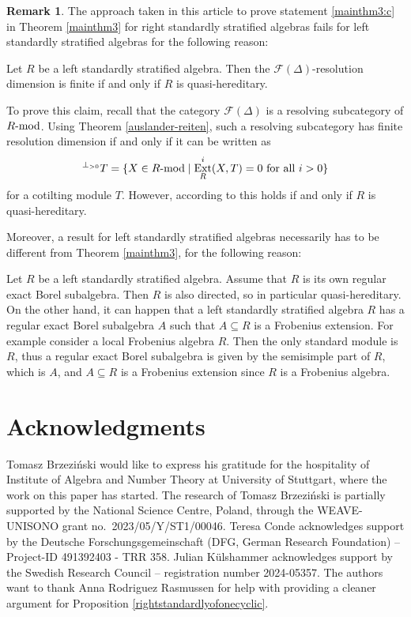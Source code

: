 \documentclass[12pt,a4paper]{amsart}
\theoremstyle{plain}
\theoremstyle{definition}
\newtheorem{rmk}[thm]{Remark}
\numberwithin{equation}{thm}
\DeclareMathOperator{\Ext}{Ext}
\newcommand{\modu}[1]{#1\hbox{-}\mathrm{mod}}
\begin{document}
\begin{rmk}
The approach taken in this article to prove statement \eqref{mainthm3:c} in Theorem
\ref{mainthm3} for right standardly stratified algebras fails for left
standardly stratified algebras for the following reason:

Let $R$ be a left standardly stratified algebra. Then the  
$\mathcal{F}(\Delta)$-resolution dimension is finite if and only if $R$ is
quasi-hereditary.
  
To prove this claim, recall that
the category $\mathcal{F}(\Delta)$ is a resolving subcategory of
$\modu{R}$. Using Theorem \ref{auslander-reiten}, such a resolving subcategory
has finite resolution dimension if and only if it can be written as 
\[{}^{\perp_{>0}} T=\{X\in \modu{R}\mid \Ext^i_R(X,T)=0\text{ for all }i>0\}\] 
for a cotilting module $T$. However, according to \cite[Theorem 2.4]{AHLU00}
this holds if and only if $R$ is quasi-hereditary.   
\medskip

Moreover, a result for left standardly stratified algebras necessarily has
to be different from Theorem \ref{mainthm3}, for the following reason:

Let $R$ be a left standardly stratified algebra. Assume that $R$ is its own regular exact Borel subalgebra. Then $R$ is also directed, so in particular quasi-hereditary. On the other hand, it can happen that a left standardly stratified algebra $R$ has a regular exact Borel subalgebra $A$ such that $A\subseteq R$ is a Frobenius extension. For example consider a local Frobenius algebra $R$. Then the only standard module is $R$, thus a regular exact Borel subalgebra is given by the semisimple part of $R$, which is $A$, and $A\subseteq R$ is a Frobenius extension since $R$ is a Frobenius algebra. 
\end{rmk}


\section*{Acknowledgments}
Tomasz Brzezi\'nski would like to express his gratitude for the hospitality of Institute of Algebra and Number Theory at University of Stuttgart, where the work on this paper has started. The research  of Tomasz Brzezi\'nski is partially supported by the National Science Centre, Poland, through the WEAVE-UNISONO grant no.\ 2023/05/Y/ST1/00046. Teresa Conde acknowledges support by the Deutsche Forschungsgemeinschaft (DFG, German Research Foundation) -- Project-ID 491392403 - TRR 358. Julian K\"ulshammer acknowledges support by the Swedish Research Council -- registration
number 2024-05357. The authors want to thank Anna Rodriguez Rasmussen for help with providing a cleaner argument for Proposition \ref{rightstandardlyofonecyclic}.



\end{document}
